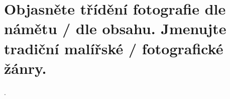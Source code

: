 \section{Objasněte třídění fotografie dle námětu / dle obsahu. Jmenujte tradiční malířské / fotografické žánry.}.